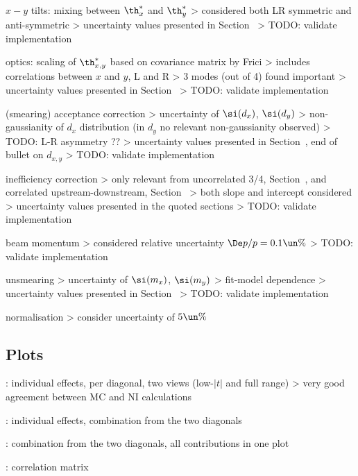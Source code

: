 \> $x-y$ tilts: mixing between $\th^*_{x}$ and $\th^*_{y}$
\>> considered both LR symmetric and anti-symmetric
\>> uncertainty values presented in Section~
\>> TODO: validate implementation

\> optics: scaling of $\th^*_{x,y}$ based on covariance matrix by Frici
\>> includes correlations between $x$ and $y$, L and R
\>> 3 modes (out of 4) found important
\>> uncertainty values presented in Section~
\>> TODO: validate implementation

\> (smearing) acceptance correction
\>> uncertainty of $\si(d_x)$, $\si(d_y)$
\>> non-gaussianity of $d_x$ distribution (in $d_y$ no relevant non-gaussianity observed)
\>> TODO: L-R asymmetry ??
\>> uncertainty values presented in Section~, end of bullet on $d_{x,y}$
\>> TODO: validate implementation

\> inefficiency correction
\>> only relevant from uncorrelated 3/4, Section~, and correlated upstream-downstream, Section~
\>> both slope and intercept considered
\>> uncertainty values presented in the quoted sections
\>> TODO: validate implementation

\> beam momentum
\>> considered relative uncertainty $\De p/p = 0.1\un{\%}$
\>> TODO: validate implementation

\> unsmearing
\>> uncertainty of $\si(m_x)$, $\si(m_y)$
\>> fit-model dependence
\>> uncertainty values presented in Section~
\>> TODO: validate implementation

\> normalisation
\>> consider uncertainty of $5\un{\%}$


\subsection[systematics-plots]{Plots}

\>  : individual effects, per diagonal, two views (low-$|t|$ and full range)
\>> very good agreement between MC and NI calculations

\>  : individual effects, combination from the two diagonals

\>  : combination from the two diagonals, all contributions in one plot

\>  : correlation matrix

\bye
